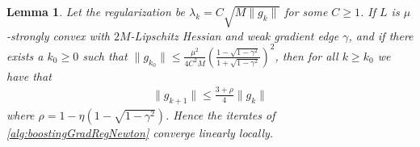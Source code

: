 \documentclass{article}
\theoremstyle{plain}
\newtheorem{lemma}[theorem]{Lemma}
\theoremstyle{definition}
\theoremstyle{remark}
\begin{document}


\clearpage

\begin{lemma}
Let the regularization be $\lambda_k = C \sqrt{M\|g_k\|}$ for some $C\geq 1$. If $L$ is $\mu$-strongly convex with $2M$-Lipschitz Hessian and weak gradient edge $\gamma$, and if there exists a $k_0\geq 0$ such that $\|g_{k_0}\| \leq \frac{\mu^2}{4C^2M}\left( \frac{1-\sqrt{1-\gamma^2}}{1+\sqrt{1-\gamma^2}}\right)^2$, then for all $k\geq k_0$ we have that
\begin{align}
    \|g_{k+1}\| \leq \frac{3 + \rho}{4} \|g_k\|
\end{align}
where $\rho = 1 - \eta(1-\sqrt{1-\gamma^2})$. Hence the iterates of \cref{alg:boostingGradRegNewton} converge linearly locally.
\end{lemma}
\end{document}
